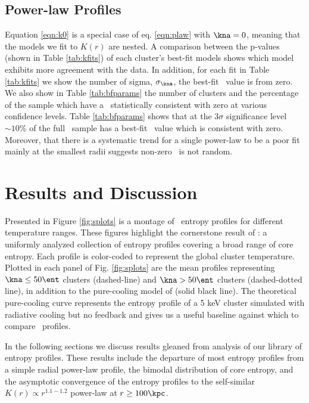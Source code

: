 \documentclass{emulateapj}
\begin{document}
\subsection{Power-law Profiles}
\label{sec:quality}

Equation \ref{eqn:k0} is a special case of eq. \ref{eqn:plaw} with
$\kna = 0$, meaning that the models we fit to $K(r)$ are nested. A
comparison between the p-values (shown in Table \ref{tab:kfits}) of
each cluster's best-fit models shows which model exhibits more
agreement with the data. In addition, for each fit in Table
\ref{tab:kfits} we show the number of sigma, $\sigma_{\kna}$, the
best-fit \kna\ value is from zero. We also show in Table
\ref{tab:bfparams} the number of clusters and the percentage of the
sample which have a \kna\ statistically consistent with zero at
various confidence levels. Table \ref{tab:bfparams} shows that at the
$3\sigma$ significance level $\sim10\%$ of the full \accept\ sample
has a best-fit \kna\ value which is consistent with zero. Moreover,
that there is a systematic trend for a single power-law to be a poor
fit mainly at the smallest radii suggests non-zero \kna\ is not
random.

\section{Results and Discussion}
\label{sec:r&d}

Presented in Figure \ref{fig:splots} is a montage of \accept\ entropy
profiles for different temperature ranges. These figures highlight the
cornerstone result of \accept: a uniformly analyzed collection of
entropy profiles covering a broad range of core entropy. Each profile
is color-coded to represent the global cluster temperature. Plotted in
each panel of Fig. \ref{fig:splots} are the mean profiles representing
$\kna \le 50 \ent$ clusters (dashed-line) and $\kna > 50 \ent$
clusters (dashed-dotted line), in addition to the pure-cooling model
of \citet{voitbryan} (solid black line). The theoretical pure-cooling
curve represents the entropy profile of a 5 keV cluster simulated with
radiative cooling but no feedback and gives us a useful baseline
against which to compare \accept\ profiles.

In the following sections we discuss results gleaned from analysis of
our library of entropy profiles. These results include the departure
of most entropy profiles from a simple radial power-law profile, the
bimodal distribution of core entropy, and the asymptotic convergence
of the entropy profiles to the self-similar $K(r) \propto r^{1.1-1.2}$
power-law at $r \geq 100\kpc$.
\end{document}
